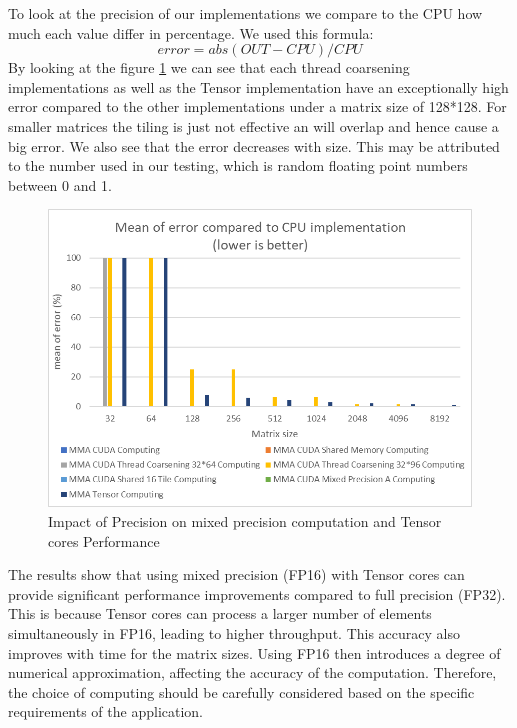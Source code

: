 \documentclass[conference]{IEEEtran}
\begin{document}
  To look at the precision of our implementations we compare to the CPU how much each value differ in percentage. We used this formula:
  \[error = abs(OUT - CPU) / CPU \]
  By looking at the figure \ref{fig:precision-impact} we can see that each thread coarsening implementations as well as the Tensor implementation
  have an exceptionally high error compared to the other implementations under a matrix size of 128*128.
  For smaller matrices the tiling is just not effective an will overlap and hence cause a big error. We also see that the error decreases with size.
  This may be attributed to the number used in our testing, which is random floating point numbers between 0 and 1. 
  \begin{figure}[htbp]
    \centering
    \includegraphics[scale=0.6]{figures/Mean of error compared to CPU 2.png}
    \caption{Impact of Precision on mixed precision computation and Tensor cores Performance}
    \label{fig:precision-impact}
  \end{figure}
  
  The results show that using mixed precision (FP16) with Tensor cores can provide significant performance improvements compared to full precision (FP32).
  This is because Tensor cores can process a larger number of elements simultaneously in FP16,
  leading to higher throughput. This accuracy also improves with time for the matrix sizes.
  Using FP16 then introduces a degree of numerical approximation, affecting the accuracy of the computation.
  Therefore, the choice of computing should be carefully considered based on the specific
  requirements of the application. 
  
  
\end{document}
